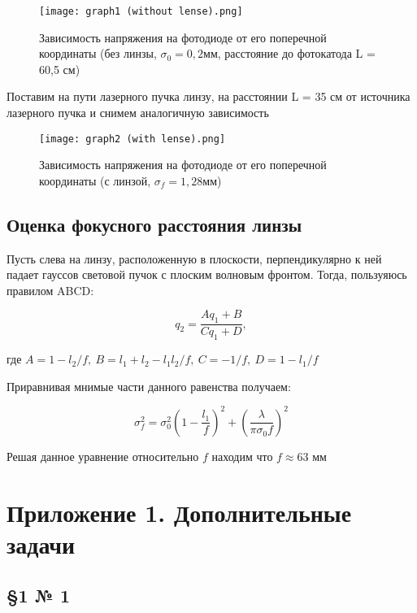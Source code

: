 \documentclass[a4paper,12pt]{article}
\begin{document}
\begin{figure}[h!]
    \centering
    \texttt{[image: graph1 (without lense).png]}
    \caption{Зависимость напряжения на фотодиоде от его поперечной координаты \linebreak (без линзы, $\sigma_0 = 0,2 мм$, расстояние до фотокатода L = 60,5 см)}
    \label{fig1:without lense}
\end{figure}

\pagebreak

Поставим на пути лазерного пучка линзу, на расстоянии L = 35 см от источника лазерного пучка и снимем аналогичную зависимость

\pagebreak

\begin{figure}[h!]
    \centering
    \texttt{[image: graph2 (with lense).png]}
    \caption{Зависимость напряжения на фотодиоде от его поперечной координаты \linebreak (с линзой, $\sigma_f = 1,28 мм$)}
    \label{fig2:wit lense}
\end{figure}

\subsection{Оценка фокусного расстояния линзы}

Пусть слева на линзу, расположенную в плоскости, перпендикулярно к ней падает гауссов световой пучок с плоским волновым фронтом. Тогда, пользуяюсь правилом ABCD:

$$
    q_2 = \frac{A q_1 + B}{C q_1 + D},
$$

где $A = 1 - l_2/f, \ B = l_1 + l_2 - l_1 l_2 / f, \  C = -1/f, \ D = 1 - l_1/f$

Приравнивая мнимые части данного равенства получаем:

$$
    \sigma^2_f = \sigma^2_0 \left(1 - \frac{l_1}{f} \right)^2 + \left( \frac{\lambda}{\pi \sigma_0 f} \right)^2 
$$

Решая данное уравнение относительно $f$ находим что $f \approx 63$ мм


\newpage

\section*{Приложение 1. Дополнительные задачи}

\subsection*{\S 1 № 1}
\end{document}
